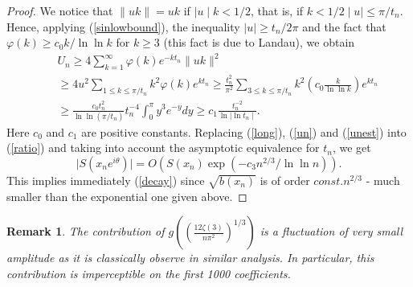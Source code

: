 \documentclass{article}
\newtheorem{remark}[theorem]{Remark}
\begin{document}
\begin{proof}
 We notice that $\parallel uk\parallel=uk$ if $\mid u\mid k<1/2$,
 that is, if $k<1/2\mid u\mid\le\pi/t_n$. Hence, applying
 (\ref{sinlowbound}), the inequality $\mid u\mid\ge t_n/2\pi$ and the fact that $\varphi(k)\ge c_0
 k/\ln{\ln{k}}$ for $k\ge 3$ (this fact is due to Landau), we obtain
 \begin{eqnarray}\label{unest}
 & & U_n\ge 4\sum_{k=1}^\infty \varphi(k) e^{-kt_n}\parallel
 uk\parallel^2 \nonumber \\
 & & \ge 4u^2\sum_{1\le k\le\pi/t_n} k^2\varphi(k) e^{kt_n}
 \ge\frac{t_n^2}{\pi^2} \sum_{3\le k\le\pi/t_n}
 k^2\left(c_0\frac{k}{\ln{\ln{k}}}\right)e^{kt_n} \nonumber \\
 & & \ge \frac{c_0 t_n^2}{\ln{\ln{(\pi/t_n)}}}t_n^{-4}\int_0^\pi y^3
 e^{-y}dy \ge c_1\frac{t_n^{-2}}{\ln{\mid\ln{t_n}\mid}}.
 \end{eqnarray}
 Here $c_0$ and $c_1$ are positive constants. Replacing
 (\ref{long}), (\ref{un}) and (\ref{unest}) into (\ref{ratio}) and
 taking into account the asymptotic equivalence for $t_n$, we get
 $$
 \mid S(x_n e^{i\theta})\mid =O(S(x_n) \exp{(-c_3
 n^{2/3}/\ln{\ln{n}})}).
 $$
This implies immediately (\ref{decay}) since $\sqrt{b(x_n)}$ is of
order $const.n^{2/3}$ - much smaller than the exponential one
given above.



\end{proof}
\begin{remark}
The contribution of $g\left(\left(\frac{12\zeta(3)}{n\pi^2}\right)^{1/3}\right)$ is a fluctuation of very small amplitude as it is classically observe in similar analysis. 
In particular, this contribution is imperceptible on the first 1000 coefficients.
\end{remark}
\end{document}
